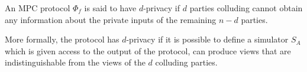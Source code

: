 \begin{definition}[d-Privacy]
\label{def:mpc:d-privacy}
  An MPC protocol $\Phi_{f}$ is said to have $d$-privacy if $d$ parties colluding
  cannot obtain any information about the private inputs of the remaining $n-d$ parties.

  More formally, the protocol has $d$-privacy if it is possible to define a
  simulator $S_{A}$ which is given access to the output of the protocol,
  can produce views that are indistinguishable from the views of the $d$ colluding
  parties.
\end{definition}

